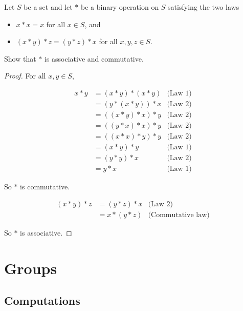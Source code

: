 \newpage
\begin{exercise}
    Let $S$ be a set and let $*$ be a binary operation on $S$ satisfying the two laws
    \begin{itemize}
        \item $x * x = x$ for all $x\in S$, and
        \item $(x * y) * z = (y * z) * x$ for all $x, y, z\in S$.
    \end{itemize}

    Show that $*$ is associative and commutative.
\end{exercise}

\begin{proof}
    For all $x, y\in S$,

    \begin{align*}
        x * y & = (x * y) * (x * y) & \text{(Law 1)} \\
              & = (y * (x * y)) * x & \text{(Law 2)} \\
              & = ((x * y) * x) * y & \text{(Law 2)} \\
              & = ((y * x) * x) * y & \text{(Law 2)} \\
              & = ((x * x) * y) * y & \text{(Law 2)} \\
              & = (x * y) * y       & \text{(Law 1)} \\
              & = (y * y) * x       & \text{(Law 2)} \\
              & = y * x             & \text{(Law 1)}
    \end{align*}

    So $*$ is commutative.

    \begin{align*}
        (x * y) * z & = (y * z) * x & \text{(Law 2)}           \\
                    & = x * (y * z) & \text{(Commutative law)}
    \end{align*}

    So $*$ is associative.
\end{proof}

\newpage
\section{Groups}

\subsection*{Computations}

